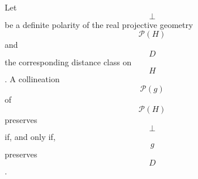 Let $$\perp$$ be a definite polarity of the real projective geometry $$\mathcal{P}(H)$$ and $$D$$ the corresponding distance class on $$H$$. A collineation $$\mathcal{P}(g)$$ of $$\mathcal{P}(H)$$ preserves $$\perp$$ if, and only if, $$g$$ preserves $$D$$.
